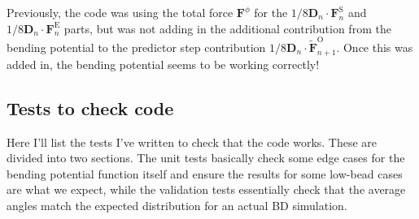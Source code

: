 \documentclass{article}
\begin{document}
Previously, the code was using the total force $\bm{F}^{\phi}$ for the $1/8 \boldsymbol{D}_{n} \cdot \boldsymbol{F}_{n}^{\mathrm{S}}$ and $1/8 \boldsymbol{D}_{n} \cdot \boldsymbol{F}_{n}^{\mathrm{E}}$ parts, but was not adding in the additional contribution from the bending potential to the predictor step contribution $1/8 \boldsymbol{D}_{n} \cdot \tilde{\boldsymbol{F}}_{n+1}^{\mathrm{O}}$. 
Once this was added in, the bending potential seems to be working correctly!

\subsection{Tests to check code}
Here I'll list the tests I've written to check that the code works. These are divided into two sections. The unit tests basically check some edge cases for the bending potential function itself and ensure the results for some low-bead cases are what we expect, while the validation tests essentially check that the average angles match the expected distribution for an actual BD simulation.
\end{document}
